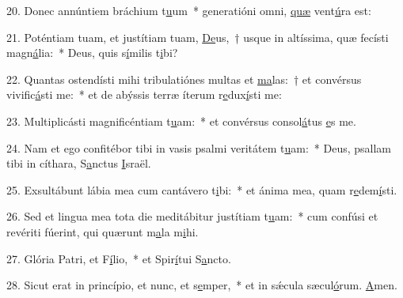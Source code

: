 20. Donec annúntiem bráchium t\uline{u}um~* generatióni omni, \uline{quæ} vent\uline{ú}ra est:\par 
21. Poténtiam tuam, et justítiam tuam, \uline{De}us,~† usque in altíssima, quæ fecísti magn\uline{á}lia:~* Deus, quis s\uline{í}milis t\uline{i}bi?\par 
22. Quantas ostendísti mihi tribulatiónes multas et \uline{ma}las:~† et convérsus vivific\uline{á}sti me:~* et de abýssis terræ íterum r\uline{e}dux\uline{í}sti me:\par 
23. Multiplicásti magnificéntiam t\uline{u}am:~* et convérsus consol\uline{á}tus \uline{e}s me.\par 
24. Nam et ego confitébor tibi in vasis psalmi veritátem t\uline{u}am:~* Deus, psallam tibi in cíthara, S\uline{a}nctus \uline{I}sraël.\par 
25. Exsultábunt lábia mea cum cantávero t\uline{i}bi:~* et ánima mea, quam r\uline{e}dem\uline{í}sti.\par 
26. Sed et lingua mea tota die meditábitur justítiam t\uline{u}am:~* cum confúsi et revériti fúerint, qui quærunt m\uline{a}la m\uline{i}hi.\par 
27. Glória Patri, et F\uline{í}lio,~* et Spir\uline{í}tui S\uline{a}ncto.\par 
28. Sicut erat in princípio, et nunc, et s\uline{e}mper,~* et in sǽcula sæcul\uline{ó}rum. \uline{A}men.\par 
